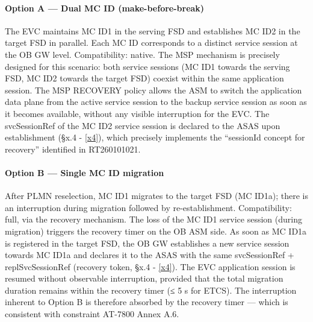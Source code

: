 \documentclass[11pt,a4paper]{article}
\begin{document}
\paragraph{Option A — Dual MC ID (make-before-break)}
The EVC maintains MC ID1 in the serving FSD and establishes MC ID2 in the target FSD in parallel. Each MC ID corresponds to a distinct service session at the OB GW level.
Compatibility: native. The MSP mechanism is precisely designed for this scenario: both service sessions (MC ID1 towards the serving FSD, MC ID2 towards the target FSD) coexist within the same application session. The MSP RECOVERY policy allows the ASM to switch the application data plane from the active service session to the backup service session as soon as it becomes available, without any visible interruption for the EVC. The svcSessionRef of the MC ID2 service session is declared to the ASAS upon establishment (§x.4 - \ref{x4}), which precisely implements the “sessionId concept for recovery” identified in RT260101021.
\paragraph{Option B — Single MC ID migration}
After PLMN reselection, MC ID1 migrates to the target FSD (MC ID1a); there is an interruption during migration followed by re-establishment.
Compatibility: full, via the recovery mechanism. The loss of the MC ID1 service session (during migration) triggers the recovery timer on the OB ASM side. As soon as MC ID1a is registered in the target FSD, the OB GW establishes a new service session towards MC ID1a and declares it to the ASAS with the same svcSessionRef + replSvcSessionRef (recovery token, §x.4 - \ref{x4}). The EVC application session is resumed without observable interruption, provided that the total migration duration remains within the recovery timer (≤ 5 s for ETCS). The interruption inherent to Option B is therefore absorbed by the recovery timer — which is consistent with constraint AT-7800 Annex A.6.
\end{document}
